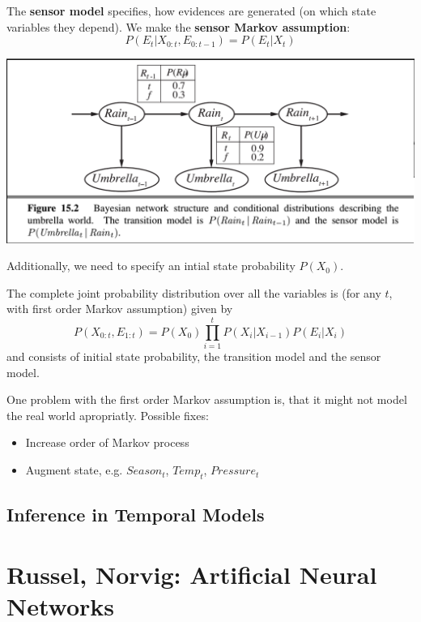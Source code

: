\documentclass{scrartcl}
\begin{document}
\bigbreak

The \textbf{sensor model} specifies, how evidences are generated (on which state variables they depend). We make the \textbf{sensor Markov assumption}:
\[P(E_t | X_{0:t}, E_{0:t-1}) = P(E_t | X_t)\]

\begin{center}
    \includegraphics[scale=0.4]{img/transenmod.png}
\end{center}

Additionally, we need to specify an intial state probability \(P(X_0)\).

The complete joint probability distribution over all the variables is (for any \(t\), with first order Markov assumption) given by
\[P(X_{0:t}, E_{1:t}) = P(X_0) \prod_{i=1}^t P(X_i|X_{i-1}) P(E_i | X_i)\]
and consists of initial state probability, the transition model and the sensor model.

One problem with the first order Markov assumption is, that it might not model the real world apropriatly. Possible fixes:
\begin{itemize}
    \item
        Increase order of Markov process
    \item
        Augment state, e.g. \(Season_t\), \(Temp_t\), \(Pressure_t\) 
\end{itemize}

\subsection{Inference in Temporal Models}












\newpage
\section{Russel, Norvig: Artificial Neural Networks}
\end{document}
